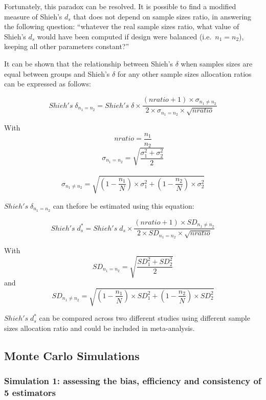 \documentclass[
  man,floatsintext]{apa6}
\begin{document}
Fortunately, this paradox can be resolved. It is possible to find a modified measure of Shieh's \(d_s\) that does not depend on sample sizes ratio, in answering the following question: \enquote{whatever the real sample sizes ratio, what value of Shieh's \(d_s\) would have been computed if design were balanced (i.e.~\(n_1 = n_2\)), keeping all other parameters constant?}

It can be shown that the relationship between Shieh's \(\delta\) when samples sizes are equal between groups and Shieh's \(\delta\) for any other sample sizes allocation ratios can be expressed as follows:

\begin{equation} 
Shieh's \; \delta_{n_1=n_2}= Shieh's \; \delta \times \frac{(nratio+1) \times \sigma_{n_1 \neq n_2}}{2 \times \sigma_{n_1=n_2} \times \sqrt{nratio}}
\label{eq:shiehvsbaldesignPOP}
\end{equation}

With \[nratio= \frac{n_1}{n_2}\]
\[\sigma_{n_1=n_2}= \sqrt{\frac{\sigma_1^2+\sigma_2^2}{2}}\]\\
\[\sigma_{n_1 \neq n_2} = \sqrt{(1- \frac{n_1}{N}) \times \sigma_1^2+(1- \frac{n_2}{N}) \times \sigma_2^2}\]

\(Shieh's \; \delta_{n_1=n_2}\) can thefore be estimated using this equation:

\begin{equation} 
Shieh's \; d^*_s= Shieh's \; d_s \times \frac{(nratio+1) \times SD_{n_1 \neq n_2}}{2 \times SD_{n_1=n_2} \times \sqrt{nratio}}
\label{eq:shiehvsbaldesign}
\end{equation}

With \[SD_{n_1=n_2}= \sqrt{\frac{SD_1^2+SD_2^2}{2}}\] and
\[SD_{n_1 \neq n_2} = \sqrt{(1- \frac{n_1}{N}) \times SD_1^2+(1- \frac{n_2}{N}) \times SD_2^2}\]

\(Shieh's \; d^*_s\) can be compared across two different studies using different sample sizes allocation ratio and could be included in meta-analysis.

\hypertarget{monte-carlo-simulations}{%
\subsection{Monte Carlo Simulations}\label{monte-carlo-simulations}}

\hypertarget{simulation-1-assessing-the-bias-efficiency-and-consistency-of-5-estimators}{%
\subsubsection{Simulation 1: assessing the bias, efficiency and consistency of 5 estimators}\label{simulation-1-assessing-the-bias-efficiency-and-consistency-of-5-estimators}}
\end{document}
